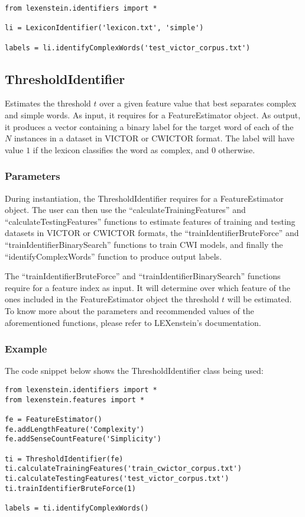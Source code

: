 \begin{lstlisting}
from lexenstein.identifiers import *

li = LexiconIdentifier('lexicon.txt', 'simple')

labels = li.identifyComplexWords('test_victor_corpus.txt')
\end{lstlisting}



\subsection{ThresholdIdentifier}

Estimates the threshold $t$ over a given feature value that best separates complex and simple words. As input, it requires for a FeatureEstimator object. As output, it produces a vector containing a binary label for the target word of each of the $N$ instances in a dataset in VICTOR or CWICTOR format. The label will have value $1$ if the lexicon classifies the word as complex, and $0$ otherwise.

\subsubsection{Parameters}

During instantiation, the ThresholdIdentifier requires for a FeatureEstimator object. The user can then use the ``calculateTrainingFeatures'' and ``calculateTestingFeatures'' functions to estimate features of training and testing datasets in VICTOR or CWICTOR formats, the ``trainIdentifierBruteForce'' and ``trainIdentifierBinarySearch'' functions to train CWI models, and finally the ``identifyComplexWords'' function to produce output labels.

The ``trainIdentifierBruteForce'' and ``trainIdentifierBinarySearch'' functions require for a feature index as input. It will determine over which feature of the ones included in the FeatureEstimator object the threshold $t$ will be estimated. To know more about the parameters and recommended values of the aforementioned functions, please refer to LEXenstein's documentation.

\subsubsection{Example}

The code snippet below shows the ThresholdIdentifier class being used:

\begin{lstlisting}
from lexenstein.identifiers import *
from lexenstein.features import *

fe = FeatureEstimator()
fe.addLengthFeature('Complexity')
fe.addSenseCountFeature('Simplicity')

ti = ThresholdIdentifier(fe)
ti.calculateTrainingFeatures('train_cwictor_corpus.txt')
ti.calculateTestingFeatures('test_victor_corpus.txt')
ti.trainIdentifierBruteForce(1)

labels = ti.identifyComplexWords()
\end{lstlisting}








